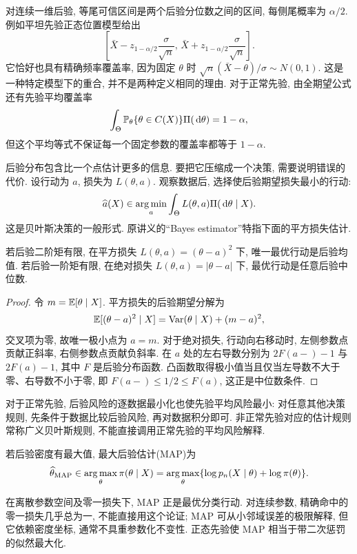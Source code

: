 对连续一维后验, 等尾可信区间是两个后验分位数之间的区间, 每侧尾概率为 $\alpha/2$. 例如平坦先验正态位置模型给出
\[
 \left[\bar X-z_{1-\alpha/2}\frac\sigma{\sqrt n},\,
       \bar X+z_{1-\alpha/2}\frac\sigma{\sqrt n}\right].
\]
它恰好也具有精确频率覆盖率, 因为固定 $\theta$ 时 $\sqrt n(\bar X-\theta)/\sigma\sim N(0,1)$. 这是一种特定模型下的重合, 并不是两种定义相同的理由. 对于正常先验, 由全期望公式还有先验平均覆盖率
\[
 \int_\Theta\mathbb P_\theta\{\theta\in C(X)\}\Pi(\,\mathrm d\theta)=1-\alpha,
\]
但这个平均等式不保证每一个固定参数的覆盖率都等于 $1-\alpha$. 

后验分布包含比一个点估计更多的信息. 要把它压缩成一个决策, 需要说明错误的代价. 设行动为 $a$, 损失为 $L(\theta,a)$. 观察数据后, 选择使后验期望损失最小的行动: 
\[
 \widehat a(X)\in\operatorname*{arg\,min}_a\int_\Theta L(\theta,a)\Pi(\,\mathrm d\theta\mid X).
\]
这是贝叶斯决策的一般形式. 原讲义的“Bayes estimator”特指下面的平方损失估计. 

\begin{proposition}[平方损失与绝对损失]
若后验二阶矩有限, 在平方损失 $L(\theta,a)=(\theta-a)^2$ 下, 唯一最优行动是后验均值. 若后验一阶矩有限, 在绝对损失 $L(\theta,a)=|\theta-a|$ 下, 最优行动是任意后验中位数. 
\end{proposition}
\begin{proof}
令 $m=\mathbb E[\theta\mid X]$. 平方损失的后验期望分解为
\[
 \mathbb E[(\theta-a)^2\mid X]=\operatorname{Var}(\theta\mid X)+(m-a)^2,
\]
交叉项为零, 故唯一极小点为 $a=m$. 对于绝对损失, 行动向右移动时, 左侧参数点贡献正斜率, 右侧参数点贡献负斜率. 在 $a$ 处的左右导数分别为 $2F(a-)-1$ 与 $2F(a)-1$, 其中 $F$ 是后验分布函数. 凸函数取得极小值当且仅当左导数不大于零、右导数不小于零, 即 $F(a-)\leq1/2\leq F(a)$, 这正是中位数条件. 
\end{proof}
对于正常先验, 后验风险的逐数据最小化也使先验平均风险最小: 对任意其他决策规则, 先条件于数据比较后验风险, 再对数据积分即可. 非正常先验对应的估计规则常称广义贝叶斯规则, 不能直接调用正常先验的平均风险解释. 

\begin{definition}[最大后验估计]
若后验密度有最大值, 最大后验估计(MAP)为
\[
 \widehat\theta_{\mathrm{MAP}}\in\operatorname*{arg\,max}_\theta\pi(\theta\mid X)
 =\operatorname*{arg\,max}_\theta\{\log p_n(X\mid\theta)+\log\pi(\theta)\}.
\]
\end{definition}
在离散参数空间及零一损失下, MAP 正是最优分类行动. 对连续参数, 精确命中的零一损失几乎总为一, 不能直接用这个论证; MAP 可从小邻域误差的极限解释, 但它依赖密度坐标, 通常不具重参数化不变性. 正态先验使 MAP 相当于带二次惩罚的似然最大化. 

